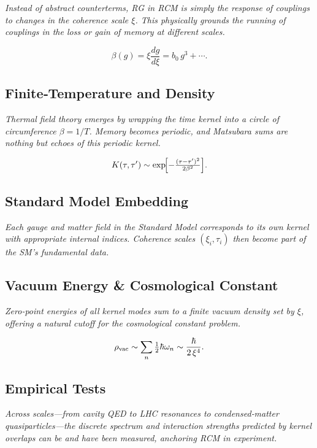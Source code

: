 \textit{Instead of abstract counterterms, RG in RCM is simply the response of couplings to changes in the coherence scale $\xi$.  This physically grounds the running of couplings in the loss or gain of memory at different scales.}

\begin{equation}\label{eq:beta_function}
\beta(g) = \xi\frac{dg}{d\xi} = b_0\,g^3 + \cdots.
\end{equation}

\subsection{Finite‐Temperature and Density}

\textit{Thermal field theory emerges by wrapping the time kernel into a circle of circumference $\beta=1/T$.  Memory becomes periodic, and Matsubara sums are nothing but echoes of this periodic kernel.}

\[
K(\tau,\tau')
\sim \exp\!\Bigl[-\tfrac{(\tau-\tau')^2}{2\beta^2}\Bigr].
\]

\subsection{Standard Model Embedding}

\textit{Each gauge and matter field in the Standard Model corresponds to its own kernel with appropriate internal indices.  Coherence scales $(\xi_i,\tau_i)$ then become part of the SM’s fundamental data.}

\subsection{Vacuum Energy \& Cosmological Constant}

\textit{Zero‐point energies of all kernel modes sum to a finite vacuum density set by $\xi$, offering a natural cutoff for the cosmological constant problem.}

\begin{equation}\label{eq:vacuum_energy}
\rho_{\rm vac}
\sim \sum_n \tfrac12\hbar\omega_n
\sim \frac{\hbar}{2\,\xi^4}.
\end{equation}

\subsection{Empirical Tests}

\textit{Across scales—from cavity QED to LHC resonances to condensed‐matter quasiparticles—the discrete spectrum and interaction strengths predicted by kernel overlaps can be and have been measured, anchoring RCM in experiment.}

